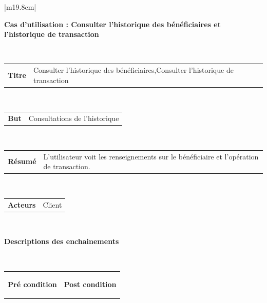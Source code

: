 \newpage

\begin{table}[h]
	\hspace*{-2cm}
	\vspace*{-2.5cm}
	\begin{tabular}{|m{19.8cm}|}
		\hline
		\begin{center}
			\textbf{Cas d’utilisation : Consulter l'historique des bénéficiaires et l'historique de transaction}
		\end{center}
		\\
		[-4ex] 
		\hline
		\begin{tabular}{m{3cm}|m{14cm}}
			
			\centering 	\textbf{Titre} & Consulter l'historique des bénéficiaires,Consulter l'historique de transaction
			\\
			[0ex] 
		\end{tabular}
		\\
		
		\hline
		\begin{tabular}{m{3cm}|m{14cm}}
			
			\centering 	\textbf{But} & Consultations de l'historique\\
			[0ex] 
			
		\end{tabular}
		\\
		\hline
		\begin{tabular}{m{3cm}|m{15.5cm}}
			
			\centering 	\textbf{Résumé} & L'utilisateur voit les renseignements sur le bénéficiaire et l'opération de transaction.
			\\
			[0ex] 
		\end{tabular}
		\\
		
		\hline
		\begin{tabular}{m{3cm}|m{14cm}}
			
			\centering 	\textbf{Acteurs } & Client \\[0ex]
			
		\end{tabular}
		\\
		
		\hline
		\begin{center}
			\textbf{Descriptions des enchainements}
		\end{center}
		\\
		[-4ex] 
		\hline	
		\begin{tabular}{m{9.3cm}|m{9.3cm}}
			
			\begin{center}
				\textbf{Pré condition}
			\end{center}
			& 
			\begin{center}
				\textbf{Post condition}
			\end{center}
			\\[-4ex]
		\end{tabular}
		\\
		

\end{tabular}
\end{table}
